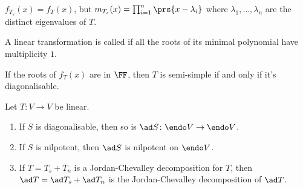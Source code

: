 \documentclass[10pt,a4paper,twoside,openany,hidelinks]{book}
\begin{document}
\begin{remark}
$f_{T_s}(x) = f_T(x)$, but $m_{T_s}(x) = \prod_{i=1}^n \prs{x-\lambda_i}$ where $\lambda_1,\ldots,\lambda_n$ are the distinct eigenvalues of $T$.
\end{remark}
\begin{definition}
A linear transformation is called  if all the roots of its minimal polynomial have multiplicity $1$.
\end{definition}
\begin{fact}
If the roots of $f_{T}(x)$ are in $\FF$, then $T$ is semi-simple if and only if it's diagonalisable.
\end{fact}
\begin{proposition}
Let $T \colon V \to V$ be linear.
\begin{enumerate}
\item If $S$ is diagonalisable, then so is $\ad S \colon \endo V \to \endo V$.
\item If $S$ is nilpotent, then $\ad S$ is nilpotent on $\endo V$.
\item If $T = T_s + T_n$ is a Jordan-Chevalley decomposition for $T$, then $\ad T = \ad T_s + \ad T_n$ is the Jordan-Chevalley decomposition of $\ad T$. 
\end{enumerate}
\end{proposition}
\end{document}
